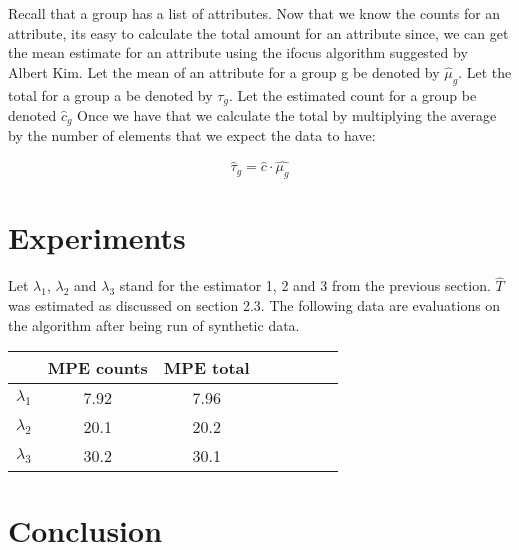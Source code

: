 \documentclass[a4paper]{article}
\begin{document}
Recall that a group has a list of attributes.
Now that we know the counts for an attribute, its easy to calculate the total amount for an attribute since, we can get the mean estimate for an attribute using the ifocus algorithm suggested by Albert Kim.
Let the mean of an attribute for a group g be denoted by $\hat{\mu}_g$. 
Let the total for a group a be denoted by $\tau_g$.
Let the estimated count for a group be denoted $\hat{c}_g$
Once we have that we calculate the total by multiplying the average by the number of elements that we expect the data to have:

$$\hat{ \tau}_g = \hat{c} \cdot \hat{\mu_g} $$


\section{Experiments}

Let $\lambda_1$, $\lambda_2$ and $\lambda_3$ stand for the estimator 1, 2 and 3 from the previous section.
$\hat{T}$ was estimated as discussed on section 2.3.
The following data are evaluations on the algorithm after being run of synthetic data.

\begin{tabular}{l*{6}{c}r}
  & MPE counts & MPE total  \\
\hline
$\lambda_1$ & 7.92 &  7.96 \\
$\lambda_2$  & 20.1 & 20.2   \\
$\lambda_3$  & 30.2 & 30.1    \\
\end{tabular}

\section{Conclusion}
\end{document}

